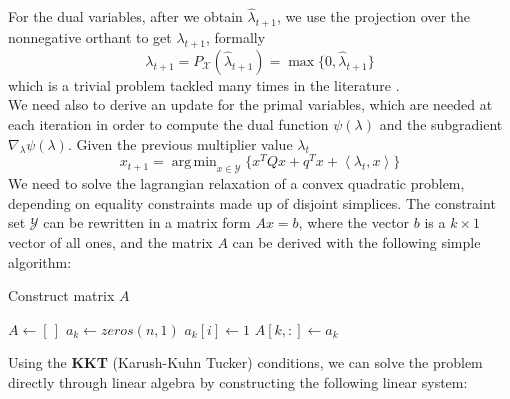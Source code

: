 \documentclass[notitlepage]{article}
\DeclareMathOperator*{\argmin}{arg\,min}
\begin{document}
For the dual variables, after we obtain $\hat{\lambda}_{t+1}$, we use the projection over the nonnegative orthant to get $\lambda_{t+1}$, formally
\[
  \lambda_{t+1} = P_\mathcal{X}(\hat{\lambda}_{t+1}) = \max{ \{ 0,\hat{\lambda}_{t+1} \} }
\]
which is a trivial problem tackled many times in the literature \cite{nonnegative-orthant}.\\
We need also to derive an update for the primal variables, which are needed at each iteration in order to compute the dual function $\psi( \lambda )$ and the subgradient $\nabla_\lambda \psi( \lambda )$. Given the previous multiplier value $\lambda_t$
\[
  x_{t+1} = \argmin_{x \in \mathcal{Y}} \{ x^T Q x + q^T x + \left\langle \lambda_t,x \right\rangle \}
\]
We need to solve the lagrangian relaxation of a convex quadratic problem, depending on equality constraints made up of disjoint simplices. The constraint set $\mathcal{Y}$ can be rewritten in a matrix form $Ax = b$, where the vector $b$ is a $k \times 1$ vector of all ones, and the matrix $A$
can be derived with the following simple algorithm:
\begin{algorithm}[H]
  \caption{Construct matrix $A$}
  \begin{algorithmic}
      \State $A \gets \left[\,\right]$
        \State $a_k \gets zeros(n,1)$
            \State $a_k[i] \gets 1$
          \EndIf
        \EndFor
        \State $A[k,:] \gets a_k$
      \EndFor
    \EndProcedure
  \end{algorithmic}
\end{algorithm}
Using the {\bf KKT} (Karush-Kuhn Tucker) conditions, we can solve the problem directly through linear algebra by constructing the following linear system:
\end{document}
